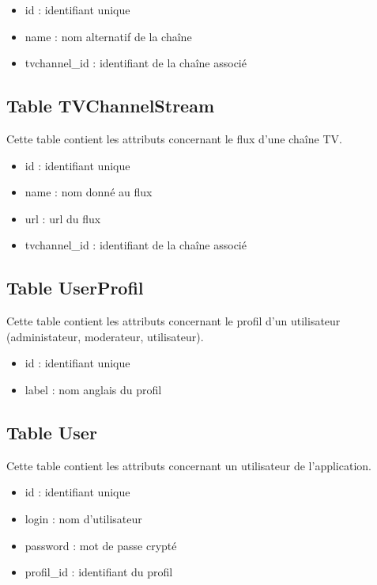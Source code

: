\documentclass[10pt,a4paper]{article}
\begin{document}
\begin{itemize}
\item id : identifiant unique
\item name : nom alternatif de la chaîne
\item tvchannel\_id : identifiant de la chaîne associé
\end{itemize}

\subsection{Table TVChannelStream}

Cette table contient les attributs concernant le flux d'une chaîne TV.

\begin{itemize}
\item id : identifiant unique
\item name : nom donné au flux
\item url : url du flux
\item tvchannel\_id : identifiant de la chaîne associé
\end{itemize}

\subsection{Table UserProfil}

Cette table contient les attributs concernant le profil d'un utilisateur (administateur, moderateur, utilisateur).

\begin{itemize}
\item id : identifiant unique
\item label : nom anglais du profil
\end{itemize}

\subsection{Table User}

Cette table contient les attributs concernant un utilisateur de l'application.

\begin{itemize}
\item id : identifiant unique
\item login : nom d'utilisateur
\item password : mot de passe crypté
\item profil\_id : identifiant du profil
\end{itemize}
\end{document}
